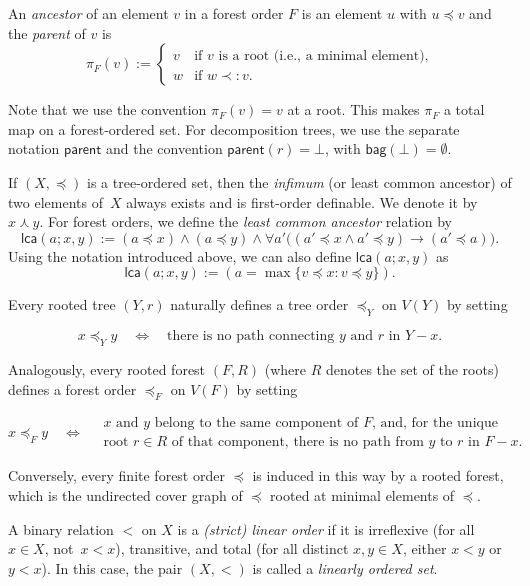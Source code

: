 \documentclass[1p,number,11pt]{elsarticle}
\theoremstyle{plain}
\newcommand{\bag}{\mathsf{bag}}
\newcommand{\parent}{\mathsf{parent}}
\newcommand{\pred}{\mathbin{\prec:}}
\newcommand{\is}{\mathrel{:=}}
\begin{document}
An \emph{ancestor} of an element $v$ in a forest order $F$ is an element $u$ with $u\preceq v$ and 
the \emph{parent} of $v$ is
\[
\pi_F(v)\is\begin{cases}
    v&\text{if $v$ is a root (i.e., a minimal element),}\\
    w&\text{if $w\pred v$.}
\end{cases}
\]

Note that we use the convention $\pi_F(v)=v$ at a root. 
This makes $\pi_F$ a total map on a forest-ordered set. For decomposition trees, we use the separate notation $\parent$ and the convention $\parent(r)=\bot$, with $\bag(\bot)=\emptyset$.

If $(X,\preceq)$ is a tree-ordered set, then the \emph{infimum} (or least common ancestor) of two elements of~$X$ always exists and is first-order definable. We denote it by $x\curlywedge y$.
For forest orders, we define the \emph{least common ancestor} relation by
\[
\mathsf{lca}(a;x,y)\is (a\preceq x)\wedge (a\preceq y) \wedge
\forall a'\bigl((a'\preceq x\wedge a'\preceq y)\rightarrow (a'\preceq a)\bigr).
\]
Using the notation introduced above, we can also define $\mathsf{lca}(a;x,y)$ as
\[
\mathsf{lca}(a;x,y)\is (a=\max\{v\preceq x\colon v\preceq y\}).
\]

Every rooted tree $(Y,r)$ naturally defines a tree order $\preceq_Y$ on $V(Y)$ by setting

\[
x\preceq_{Y} y
\quad\Longleftrightarrow\quad
\text{there is no path connecting $y$ and $r$ in $Y-x$.}
\]

Analogously, every rooted forest $(F,R)$ (where $R$ denotes the set of the roots) defines a forest order $\preceq_F$ on $V(F)$ by setting

\[
x\preceq_{F} y
\quad\Longleftrightarrow\quad
\begin{gathered}
\text{$x$ and $y$ belong to the same component of $F$, and, for the unique}\\
\text{root $r\in R$ of that component, there is no path from $y$ to $r$ in $F-x$.}
\end{gathered}
\]

Conversely, every finite forest order $\preceq$ is induced in this way by a rooted forest, which is the undirected cover graph of $\preceq$ rooted at minimal elements of $\preceq$.

A binary relation $<$ on $X$ is a \emph{(strict) linear order} if it is irreflexive
(for all $x\in X$, not~$x<x$),
transitive,
and total
(for all distinct $x,y\in X$, either $x<y$ or $y<x$).
In this case, the pair $(X,<)$ is called a \emph{linearly ordered set}.
\end{document}

